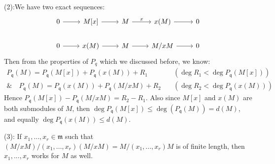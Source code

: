 \documentclass[12pt]{article}
\theoremstyle{definition}
\theoremstyle{plain}
\begin{document}
\medskip
(2):We have two exact sequences:
\begin{equation*}
  \begin{tikzcd}
    0\rar &M[x]\rar &M \rar{x} &x(M)\rar &0\\
    0\rar &x(M)\rar &M\rar &M/xM\rar &0
  \end{tikzcd}
\end{equation*}
Then from the properties of $P_q$ which we discussed before, we know:
\begin{align*}
  P_\mathfrak{q}(M)=P_\mathfrak{q}(M[x])+P_\mathfrak{q}(x(M))+R_1 &\quad (\deg R_1<\deg P_\mathfrak{q}(M[x]))\\
  \& \quad P_\mathfrak{q}(M)=P_\mathfrak{q}(x(M))+P_\mathfrak{q}(M/xM)+R_2 &\quad (\deg R_2<\deg P_\mathfrak{q}(x(M)))
\end{align*}
Hence $P_\mathfrak{q}(M[x])-P_\mathfrak{q}(M/xM)=R_2-R_1$. Also since $M[x]$ and $x(M)$ are both submodules of $M$, then $\deg P_\mathfrak{q}(M[x])\leq \deg(P_\mathfrak{q}(M))=d(M)$, and equally $\deg P_\mathfrak{q}(x(M))\leq d(M)$.

\medskip
(3): If $ x_1, ..., x_r\in \mathfrak{m}$ such that $(M/xM)/(x_1, ..., x_r)(M/xM)=M/(x_1, ..., x_r)M$ is of finite length, then $x_1, ..., x_r$ works for $M$ as well.
\end{document}
